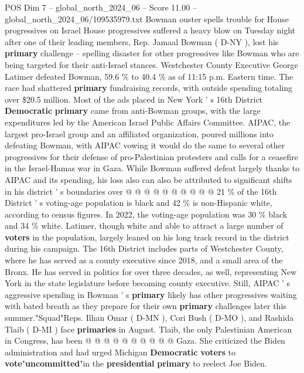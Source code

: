 \begin{textsample}{POS Dim 7 – global\_north\_2024\_06 – Score 11.00 – global\_north\_2024\_06/109535979.txt}  \label{ex:f7_pos_089}
Bowman ouster spells trouble for House progressives on Israel House progressives suffered a heavy blow on Tuesday night after one of their leading members, Rep.
Jamaal Bowman ( D-NY ), lost his \textbf{primary} challenge -- spelling disaster for other progressives like Bowman who are being targeted for their anti-Israel stances.
Westchester County Executive George Latimer defeated Bowman, 59.6 \% to 40.4 \% as of 11:15 p.m.
Eastern time.
The race had shattered \textbf{primary} fundraising records, with outside spending totaling over \$20.5 million.
Most of the ads placed in New York ' s 16th District \textbf{Democratic} \textbf{primary} came from anti-Bowman groups, with the large expenditures led by the American Israel Public Affairs Committee.
AIPAC, the largest pro-Israel group and an affiliated organization, poured millions into defeating Bowman, with AIPAC vowing it would do the same to several other progressives for their defense of pro-Palestinian protesters and calls for a ceasefire in the Israel-Hamas war in Gaza.
While Bowman suffered defeat largely thanks to AIPAC and its spending, his loss also can also be attributed to significant shifts in his district ' s boundaries over @ @ @ @ @ @ @ @ @ @ 21 \% of the 16th District ' s voting-age population is black and 42 \% is non-Hispanic white, according to census figures.
In 2022, the voting-age population was 30 \% black and 34 \% white.
Latimer, though white and able to attract a large number of \textbf{voters} in the population, largely leaned on his long track record in the district during his campaign.
The 16th District includes parts of Westchester County, where he has served as a county executive since 2018, and a small area of the Bronx.
He has served in politics for over three decades, as well, representing New York in the state legislature before becoming county executive.
Still, AIPAC ' s aggressive spending in Bowman ' s \textbf{primary} likely has other progressives waiting with bated breath as they prepare for their own \textbf{primary} challenges later this summer."Squad"Reps.
Ilhan Omar ( D-MN ), Cori Bush ( D-MO ), and Rashida Tlaib ( D-MI ) face \textbf{primaries} in August.
Tlaib, the only Palestinian American in Congress, has been @ @ @ @ @ @ @ @ @ @ Gaza.
She criticized the Biden administration and had urged Michigan \textbf{Democratic} \textbf{voters} to \textbf{vote}"\textbf{uncommitted}"in the \textbf{presidential} \textbf{primary} to reelect Joe Biden.

\end{textsample}
